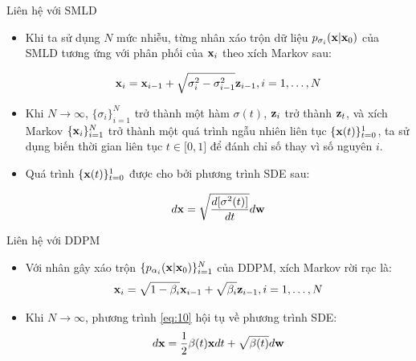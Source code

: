 \documentclass[10pt]{beamer}
\theoremstyle{remark}
\numberwithin{algocf}{section}
\numberwithin{equation}{section}
\numberwithin{dl}{section}
\numberwithin{figure}{section}
\begin{document}
\begin{frame}{Liên hệ với SMLD}
	\begin{itemize}
		\item Khi ta sử dụng $N$ mức nhiễu, từng nhân xáo trộn dữ liệu $p_{\sigma_i}(\bold{x} \vert \bold{x}_0)$ của SMLD tương ứng với phân phối của $\bold{x}_i$ theo xích Markov sau:

		\begin{equation}
		    \bold{x}_i = \bold{x}_{i-1} + \sqrt{\sigma_i^2 - \sigma_{i-1}^2} \bold{z}_{i-1}, i=1, \dots, N
		\end{equation}
		\item Khi $N \rightarrow \infty$, $\lbrace \sigma_i \rbrace_{i=1}^N$ trở thành một hàm $\sigma(t)$, $\bold{z}_i$ trở thành $\bold{z}_t$, và xích Markov $\lbrace \bold{x}_i \rbrace_{i=1}^N$ trở thành một quá trình ngẫu nhiên liên tục $\lbrace \bold{x}(t) \rbrace_{t=0}^1$, ta sử dụng biến thời gian liên tục $t \in \lbrack 0, 1 \rbrack$ để đánh chỉ số thay vì số nguyên $i$.
		\item Quá trình $\lbrace \bold{x}(t) \rbrace_{t=0}^1$ được cho bởi phương trình SDE sau:

		\begin{equation} \label{eq:9}
			d \bold{x} = \sqrt{\dfrac{d \lbrack \sigma^2(t) \rbrack}{dt}} d \bold{w}
		\end{equation}
	\end{itemize}
\end{frame}

\begin{frame}{Liên hệ với DDPM}
	\begin{itemize}
		\item Với nhân gây xáo trộn $\lbrace p_{\alpha_i} (\bold{x} \vert \bold{x}_0) \rbrace_{i=1}^N$ của DDPM, xích Markov rời rạc là:
		\begin{equation} \label{eq:10}
			\bold{x}_i = \sqrt{1 - \beta_i} \bold{x}_{i-1} + \sqrt{\beta_i} \bold{z}_{i-1}, i=1,\dots,N
		\end{equation}
		\item Khi $N \rightarrow \infty$, phương trình \ref{eq:10} hội tụ về phương trình SDE:
		\begin{equation} \label{eq:11}
			d \bold{x} = \dfrac{1}{2} \beta(t) \bold{x} dt + \sqrt{\beta(t)} d\bold{w}
		\end{equation}
	\end{itemize}
\end{frame}
\end{document}
